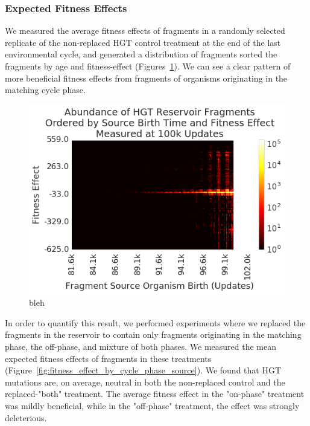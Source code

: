 \documentclass[PhD]{msu-thesis}
\begin{document}
\subsubsection{Expected Fitness Effects}

We measured the average fitness effects of fragments in a randomly selected replicate of the non-replaced HGT control treatment at the end of the last environmental cycle, and generated a distribution of fragments sorted the fragments by age and fitness-effect (Figures~\ref{fig:fitness_effect_heatmap}). We can see a clear pattern of more beneficial fitness effects from fragments of organisms originating in the matching cycle phase. 

\begin{figure}[h!]
\begin{center}
\includegraphics[width=0.7\columnwidth]{figures/HGT/fitness_effect_heatmap.png}
\caption{bleh%
}\label{fig:fitness_effect_heatmap}
\end{center}
\end{figure}

In order to quantify this result, we performed experiments where we replaced the fragments in the reservoir to contain only fragments originating in the matching phase, the off-phase, and mixture of both phases. We measured the mean expected fitness effects of fragments in these treatments (Figure~\ref{fig:fitness_effect_by_cycle_phase_source}). We found that HGT mutations are, on average, neutral in both the non-replaced control and the replaced-"both" treatment. The average fitness effect in the "on-phase" treatment was mildly beneficial, while in the "off-phase" treatment, the effect was strongly deleterious. 
\end{document}
